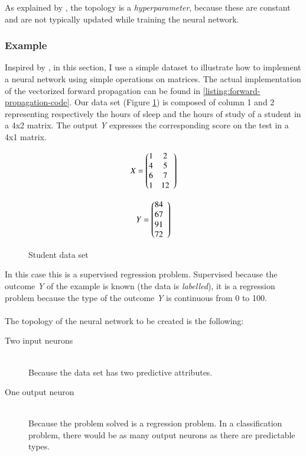 \documentclass[a4paper,12pt, oneside]{memoir}
\begin{document}
As explained by \cite{welch-labs}, the topology is a \textit{hyperparameter}, because these are constant and are not typically updated while training the neural network.

\subsubsection{Example}

Inspired by \cite{welch-labs}, in this section, I use a simple dataset to illustrate how to implement a neural network using simple operations on matrices. The actual implementation of the vectorized forward propagation can be found in \ref{listing:forward-propagation-code}. Our data set (Figure \ref{matrix-dataset}) is composed of column 1 and 2 representing respectively the hours of sleep and the hours of study of a student in a 4x2 matrix. The output \textit{Y} expresses the corresponding score on the test in a 4x1 matrix. 

\begin{figure}[h]
\begin{minipage}[h]{0.45\textwidth}
\[ X = \left(\begin{array}{@{}ccc}
  1 & 2  \\
  4 & 5  \\
  6 & 7  \\
  1 & 12 
\end{array}\right)\]
  
\end{minipage}
\hfill
\begin{minipage}[h]{0.45\textwidth}
  \[ Y = \left(\begin{array}{@{}ccc}
  84 \\
  67 \\
  91 \\
  72
\end{array}\right)\]
\end{minipage}

\caption{Student data set}
\label{matrix-dataset}
\centering
\end{figure}

In this case this is a supervised regression problem. Supervised because the outcome \textit{Y} of the example is known (the data is \textit{labelled}), it is a regression problem because the type of the outcome \textit{Y} is continuous from 0 to 100.
\\ \\
The topology of the neural network to be created is the following:
\begin{description}
  \item[Two input neurons] \hfill \\
    Because the data set has two predictive attributes.
  \item[One output neuron] \hfill \\
    Because the problem solved is a regression problem. In a classification problem, there would be as many output neurons as there are predictable types.
\end{description}
\end{document}
